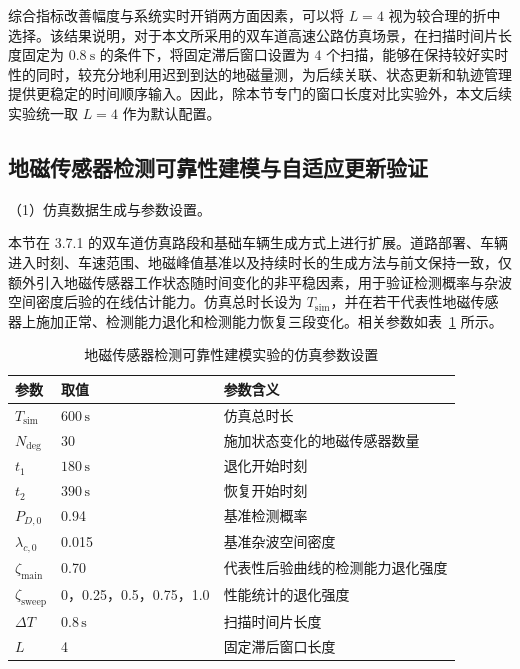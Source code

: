 \documentclass{xdupgthesis}
\begin{document}
综合指标改善幅度与系统实时开销两方面因素，可以将 $L=4$ 视为较合理的折中选择。该结果说明，对于本文所采用的双车道高速公路仿真场景，在扫描时间片长度固定为 $0.8\ \mathrm{s}$ 的条件下，将固定滞后窗口设置为 $4$ 个扫描，能够在保持较好实时性的同时，较充分地利用迟到到达的地磁量测，为后续关联、状态更新和轨迹管理提供更稳定的时间顺序输入。因此，除本节专门的窗口长度对比实验外，本文后续实验统一取 $L=4$ 作为默认配置。

\subsection{地磁传感器检测可靠性建模与自适应更新验证}

\noindent （1）仿真数据生成与参数设置。

本节在 3.7.1 的双车道仿真路段和基础车辆生成方式上进行扩展。道路部署、车辆进入时刻、车速范围、地磁峰值基准以及持续时长的生成方法与前文保持一致，仅额外引入地磁传感器工作状态随时间变化的非平稳因素，用于验证检测概率与杂波空间密度后验的在线估计能力。仿真总时长设为 $T_{\mathrm{sim}}$，并在若干代表性地磁传感器上施加正常、检测能力退化和检测能力恢复三段变化。相关参数如表~\ref{tab:ch3_node_adapt_sim} 所示。

\begin{table}[H]
	\centering
	\caption{地磁传感器检测可靠性建模实验的仿真参数设置}
	\label{tab:ch3_node_adapt_sim}
	\small
	\begin{tabular}{p{2.8cm}p{3.0cm}p{6.0cm}}
		\toprule
		参数 & 取值 & 参数含义 \\
		\midrule
		$T_{\mathrm{sim}}$ & $600\,\mathrm{s}$ & 仿真总时长 \\
		$N_{\mathrm{deg}}$ & 30 & 施加状态变化的地磁传感器数量 \\
		$t_1$ & $180\,\mathrm{s}$ & 退化开始时刻 \\
		$t_2$ & $390\,\mathrm{s}$ & 恢复开始时刻 \\
		$P_{D,0}$ & 0.94 & 基准检测概率 \\
		$\lambda_{c,0}$ & 0.015 & 基准杂波空间密度 \\
		$\zeta_{\mathrm{main}}$ & 0.70 & 代表性后验曲线的检测能力退化强度 \\
		$\zeta_{\mathrm{sweep}}$ & 0，0.25，0.5，0.75，1.0 & 性能统计的退化强度 \\
		$\Delta T$ & $0.8\,\mathrm{s}$ & 扫描时间片长度 \\
		$L$ & 4 & 固定滞后窗口长度 \\
		\bottomrule
	\end{tabular}
\end{table}
\end{document}
